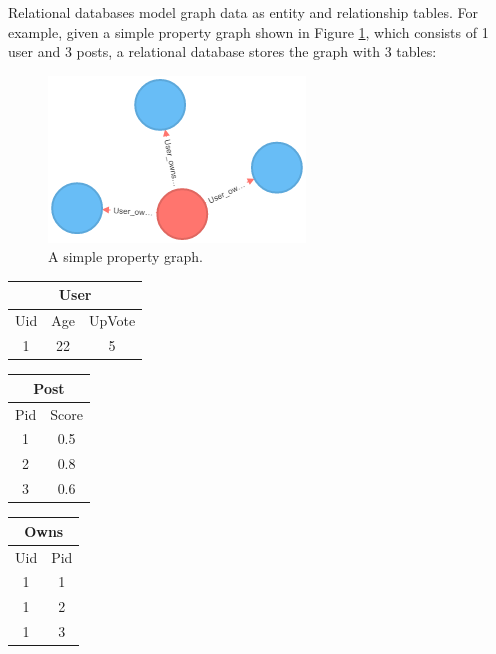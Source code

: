
Relational databases  model graph data as entity and relationship tables. For example, given a simple property graph shown in Figure \ref{fig:2:4}, which consists of 1 user and 3 posts, a relational database stores the graph with 3 tables:

\begin{figure}[H]
\centering
\includegraphics[scale=0.9]{pic/4.png}
\caption{A simple property graph.}
\label{fig:2:4}
\end{figure}


\begin{center}
\begin{tabular}{|c|c|c| }
	\hline
	\multicolumn{3}{|c|}{User} \\\hline
	Uid	& Age & UpVote	\\ \hline
	1 & 22 & 5 \\\hline
\end{tabular}
\end {center}


\begin{center}
	\begin{tabular}{|c|c|}
	\hline
	\multicolumn{2}{|c|}{Post} \\\hline
		Pid	& Score	\\ \hline
		1	& 0.5 \\
		2	& 0.8 \\
		3	& 0.6 \\\hline
	\end{tabular}
	\end {center}	


\begin{center}
	\begin{tabular}{|c|c|}
	\hline
	\multicolumn{2}{|c|}{Owns} \\\hline
		Uid	& Pid	\\ \hline
		1	&1 \\
		1	&2 \\
		1	&3 \\\hline
	\end{tabular}
	\end {center}


